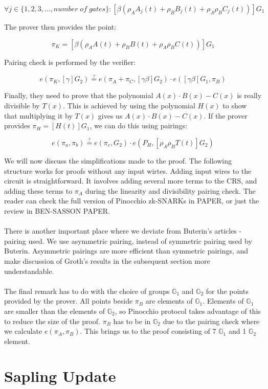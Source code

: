 $$\forall j \in \{1, 2, 3, \ldots, number\;of\;gates\} : [\beta(\rho_A A_j(t) + \rho_B B_j(t) + \rho_A \rho_B C_j(t))]G_1 $$

The prover then provides the point:

$$ \pi_{K} = [\beta(\rho_A A(t) + \rho_B B(t) + \rho_A \rho_B C(t))]G_1 $$

Pairing check is performed by the verifier:

$$ e(\pi_K, [\gamma]G_2) \stackrel{?}{=} e(\pi_A + \pi_C, [\gamma\beta]G_2) \cdot e([\gamma\beta]G_1, \pi_B) $$

Finally, they need to prove that the polynomial $A(x) \cdot B(x) - C(x)$ is really divisible by $T(x)$. This is achieved by using the polynomial $H(x)$ to show that multiplying it by $T(x)$ gives us $A(x) \cdot B(x) - C(x)$. If the prover provides $\pi_H = [H(t)]G_1$, we can do this using pairings:

$$ e(\pi_a, \pi_b) \stackrel{?}{=} e(\pi_c, G_2) \cdot e(P_H, [\rho_A \rho_B T(t)]G_2) $$

We will now discuss the simplifications made to the proof. The following structure works for proofs without any input wirtes. Adding input wires to the circuit is straightforward. It involves adding several more terms to the CRS, and adding these terms to $\pi_A$ during the linearity and divisibility pairing check. The reader can check the full version of Pinocchio zk-SNARKs in PAPER, or just the review in BEN-SASSON PAPER.\\
\\
There is another important place where we deviate from Buterin's articles - pairing used. We use asymmetric pairing, instead of symmetric pairing used by Buterin. Asymmetric pairings are more efficient than symmetric pairings, and make discussion of Groth's results in the subsequent section more understandable.\\
\\
The final remark has to do with the choice of groups $\mathbb{G}_1$ and $\mathbb{G}_2$ for the points provided by the prover. All points beside $\pi_B$ are elements of $\mathbb{G}_1$. Elements of $\mathbb{G}_1$ are smaller than the elements of $\mathbb{G}_2$, so Pinocchio protocol takes advantage of this to reduce the size of the proof. $\pi_B$ has to be in $\mathbb{G}_2$ due to the pairing check where we calculate $e(\pi_A, \pi_B)$. This brings us to the proof consisting of 7 $\mathbb{G}_1$ and 1 $\mathbb{G}_2$ element.

\section{Sapling Update}

